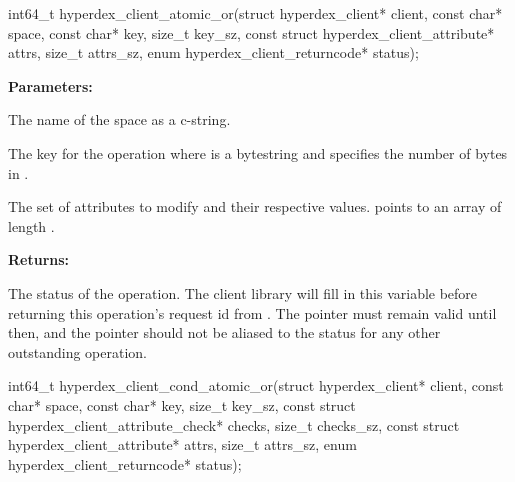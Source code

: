 \funcsep
{}
\begin{ccode}
int64_t hyperdex_client_atomic_or(struct hyperdex_client* client,
                const char* space,
                const char* key, size_t key_sz,
                const struct hyperdex_client_attribute* attrs, size_t attrs_sz,
                enum hyperdex_client_returncode* status);
\end{ccode}
\funcdesc 

\noindent\textbf{Parameters:}
\begin{description}[labelindent=\widthof{{\code{attrs}, \code{attrs\_sz}}},leftmargin=*,noitemsep,nolistsep,align=right]
\item[\code{space}] The name of the space as a c-string.
\item[\code{key}, \code{key\_sz}] The key for the operation where  is a bytestring and  specifies the number of bytes in .
\item[\code{attrs}, \code{attrs\_sz}] The set of attributes to modify and their respective values.   points to an array of length .
\end{description}

\noindent\textbf{Returns:}
\begin{description}[labelindent=\widthof{{\code{status}}},leftmargin=*,noitemsep,nolistsep,align=right]
\item[\code{status}] The status of the operation.  The client library will fill in this variable before returning this operation's request id from .  The pointer must remain valid until then, and the pointer should not be aliased to the status for any other outstanding operation.
\end{description}

\funcsep
{}
\begin{ccode}
int64_t hyperdex_client_cond_atomic_or(struct hyperdex_client* client,
                const char* space,
                const char* key, size_t key_sz,
                const struct hyperdex_client_attribute_check* checks, size_t checks_sz,
                const struct hyperdex_client_attribute* attrs, size_t attrs_sz,
                enum hyperdex_client_returncode* status);
\end{ccode}
\funcdesc 

